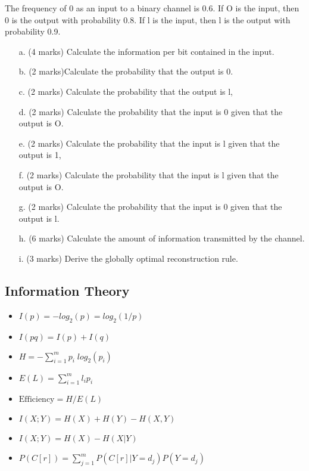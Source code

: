 The frequency of 0 as an input to a binary channel is 0.6. If O is the
input, then 0 is the output with probability 0.8. If l is the input, then l
is the output with probability 0.9.
\begin{itemize}
	\item[a.](4 marks) Calculate the information per bit contained in the input.
	\item[b.](2 marks)Calculate the probability that the output is 0.
	\item[c.](2 marks) Calculate the probability that the output is l,
	\item[d.](2 marks) Calculate the probability that the input is 0 given that the
	output is O.
	\item[e.](2 marks) Calculate the probability that the input is l given that
	the output is 1,
	\item[f.](2 marks) Calculate the probability that the input is l given that
	the output is O.
	\item[g.](2 marks) Calculate the probability that the input is 0 given that
	the output is l.
	\item[h.](6 marks) Calculate the amount of information transmitted by the channel.
	\item[i.](3 marks) Derive the globally optimal reconstruction rule.
\end{itemize}




\subsection*{Information Theory}

\begin{itemize}
	\item $I(p) = - log_{2}(p) = log_{2}(1/p)$\\
	
	\item $I(pq) = I(p) + I(q)$\\
	
	\item $H = - \sum_{i=1}^{m}p_{i}\; log_{2}(p_{i})$\\
	
	\item $E(L) = \sum_{i=1}^{m} l_{i} p_{i}$\\
	
	\item $\mbox{Efficiency} = H / E(L)$\\
	
	\item $I(X;Y) = H(X) + H(Y) - H(X,Y)$\\
	
	\item $I(X;Y) = H(X) - H(X|Y)$\\
	
	\item $P(C[r]) = \sum_{j=1}^{m}P(C[r]|Y=d_{j} )P(Y=d_{j} )$
	
\end{itemize}







